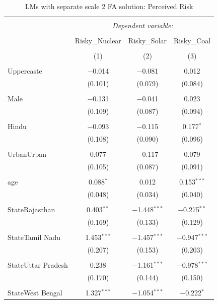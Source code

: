 \documentclass[
]{article}
\begin{document}
\begin{table}[!htbp] \centering 
  \caption{LMs with separate scale 2 FA solution: Perceived Risk} 
  \label{} 
\begin{tabular}{@{\extracolsep{5pt}}lccc} 
\\[-1.8ex]\hline 
\hline \\[-1.8ex] 
 & \multicolumn{3}{c}{\textit{Dependent variable:}} \\ 
\cline{2-4} 
\\[-1.8ex] & Risky\_Nuclear & Risky\_Solar & Risky\_Coal \\ 
\\[-1.8ex] & (1) & (2) & (3)\\ 
\hline \\[-1.8ex] 
 Uppercaste & $-$0.014 & $-$0.081 & 0.012 \\ 
  & (0.101) & (0.079) & (0.084) \\ 
  & & & \\ 
 Male & $-$0.131 & $-$0.041 & 0.023 \\ 
  & (0.109) & (0.087) & (0.094) \\ 
  & & & \\ 
 Hindu & $-$0.093 & $-$0.115 & 0.177$^{*}$ \\ 
  & (0.108) & (0.090) & (0.096) \\ 
  & & & \\ 
 UrbanUrban & 0.077 & $-$0.117 & 0.079 \\ 
  & (0.105) & (0.087) & (0.091) \\ 
  & & & \\ 
 age & 0.088$^{*}$ & 0.012 & 0.153$^{***}$ \\ 
  & (0.048) & (0.034) & (0.040) \\ 
  & & & \\ 
 StateRajasthan & 0.403$^{**}$ & $-$1.448$^{***}$ & $-$0.275$^{**}$ \\ 
  & (0.169) & (0.133) & (0.129) \\ 
  & & & \\ 
 StateTamil Nadu & 1.453$^{***}$ & $-$1.457$^{***}$ & $-$0.947$^{***}$ \\ 
  & (0.207) & (0.153) & (0.203) \\ 
  & & & \\ 
 StateUttar Pradesh & 0.238 & $-$1.161$^{***}$ & $-$0.978$^{***}$ \\ 
  & (0.170) & (0.144) & (0.150) \\ 
  & & & \\ 
 StateWest Bengal & 1.327$^{***}$ & $-$1.054$^{***}$ & $-$0.222$^{*}$ \\ 

\end{tabular}
\end{table}
\end{document}
